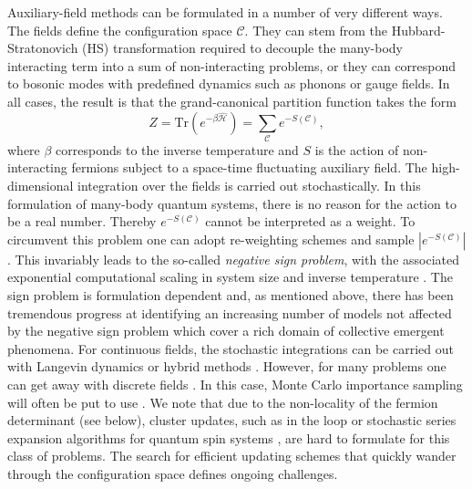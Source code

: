 Auxiliary-field methods  can be formulated in a number of very different ways.  The fields define  the  configuration space $\mathcal{C}$. They can stem from the Hubbard-Stratonovich (HS)  \cite{Hubbard59} transformation required to decouple the  many-body interacting term into a sum of non-interacting problems,  or they can correspond to  bosonic modes with predefined dynamics such as phonons or gauge fields. In all cases, the result is that  the grand-canonical partition function  takes the form
\begin{equation}
	 Z = \text{Tr}\left( e^{-\beta \hat{\mathcal{H}}}\right)   =   \sum_{\mathcal{C}} e^{-S(\mathcal{C}) },
\end{equation}
where $\beta $ corresponds to the inverse temperature and $S$  is the action of non-interacting fermions subject to a  space-time fluctuating auxiliary field.    
The high-dimensional  integration  over the fields is carried out stochastically.  In this formulation of many-body quantum systems, there is no reason for the action to be a real number.  Thereby $e^{-S(\mathcal{C})}$ cannot be interpreted as a weight. To circumvent this problem one can adopt   re-weighting schemes and sample $| e^{-S(\mathcal{C})}| $. This invariably leads to the so-called \emph{negative sign problem}, with the associated exponential computational scaling in system size and inverse temperature \cite{Troyer05}.  The sign problem is formulation dependent and, as mentioned above, there has been tremendous progress at identifying an increasing number of models not affected by the negative sign problem which cover a rich domain of collective emergent phenomena.  
For continuous fields, the stochastic integrations can  be carried out with Langevin  dynamics or hybrid methods \cite{Duane85}.   However, for many  problems one can get away with discrete fields \cite{Hirsch83}. In this case,  Monte Carlo importance sampling will often be put to use \cite{Sokal89}.  
We note that  due to  the non-locality of the fermion determinant (see below), cluster updates,  such as in the loop or stochastic series expansion algorithms for quantum spin systems  \cite{Evertz93,Sandvik99b,Sandvik02}, are hard to formulate for this class of problems.  The search for efficient updating schemes that quickly wander through the configuration space defines ongoing challenges. 

